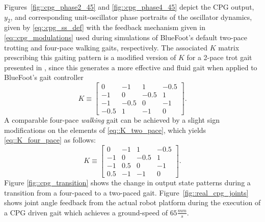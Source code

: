 			Figures~\ref{fig::cpg_phase2_45} and \ref{fig::cpg_phase4_45} depict the CPG output, $y_{2}$, and corresponding unit-oscillator phase portraits of the oscillator dynamics, given by \ref{eq::cpg_ss_def} with the feedback mechanism given in \ref{eq::cpg_modulations} used during simulations of BlueFoot's default two-pace trotting and four-pace walking gaits, respectively. The associated $K$ matrix prescribing this gaiting pattern is a modified version of $K$ for a 2-pace trot gait presented in \cite{Rutishauser2008}, since this generates a more effective and fluid gait when applied to BlueFoot's gait controller
				\begin{equation}
						K\equiv 
						\left[ 
						\begin{array}{cccc}
						 0	   	&	-1   	&	 	 1   	&		-0.5\\
						-1	   	&	 0   	&	 	-0.5   	&		 1 	\\
						-1    	&	-0.5   	&		0    	&	 	-1 	\\
						-0.5	&	 1   	&		-1    	&		 0
						\end{array}
						\right].
						\label{eq::K_two_pace}
				\end{equation}
			A comparable four-pace \emph{walking} gait can be achieved by a slight sign modifications on the elements of  \ref{eq::K_two_pace}, which yields \ref{eq::K_four_pace} as follows:
				\begin{equation}
						K\equiv 
						\left[ 
						\begin{array}{cccc}
						 0	   	&	-1   	&	 	 1   	&	  	-0.5\\
						-1	   	&	 0   	&	 	-0.5   	&		 1 	\\
						-1    	&	 0.5   	&		 0    	&	 	-1 	\\
						 0.5	&	-1   	&		-1    	&		 0
						\end{array}
						\right].
						\label{eq::K_four_pace}
				\end{equation}
			Figure \ref{fig::cpg_transition} shows the change in output state patterns during a transition from a four-paced to a two-paced gait. Figure~\ref{fig::real_cpg_joints} shows joint angle feedback from the actual robot platform during the execution of a CPG driven gait which achieves a ground-speed of $65 \frac{mm}{s}$.
